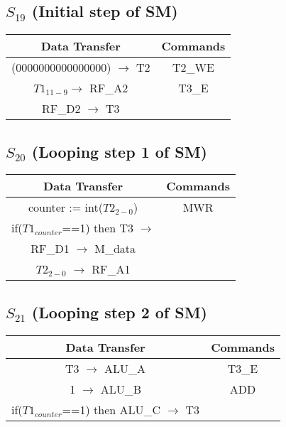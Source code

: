 \documentclass[]{article}
\begin{document}
            \subsection*{$S_{19}$ (Initial step of SM)} %
            \begin{center}
                \begin{tabular}{|c|c|}
                    \hline
                    Data Transfer & Commands \\
                    \hline
                    (0000000000000000) $\to$ T2 & T2\_WE\\
                    $T1_{11-9} \to$ RF\_A2 & T3\_E\\
                    RF\_D2 $\to$ T3 & \\
                    \hline
                \end{tabular}
            \end{center}            
            \subsection*{$S_{20}$ (Looping step 1 of SM)} %
            \begin{center}
                \begin{tabular}{|c|c|}
                    \hline
                    Data Transfer & Commands \\
                    \hline
                    counter := int($T2_{2-0}$) & MWR\\
                    if($T1_{counter}$==1) then T3 $\to$ & \\
                    RF\_D1 $\to$ M\_data & \\ %
                    $T2_{2-0}$ $\to$ RF\_A1 & \\
                    \hline
                \end{tabular}
            \end{center} 
            \subsection*{$S_{21}$ (Looping step 2 of SM)} %
            \begin{center}
                \begin{tabular}{|c|c|}
                    \hline
                    Data Transfer & Commands \\
                    \hline
                    T3 $\to$ ALU\_A & T3\_E\\
                    1 $\to$ ALU\_B & ADD\\
                    if($T1_{counter}$==1) then ALU\_C $\to$ T3 & \\
                    \hline
                \end{tabular}
            \end{center} 
\end{document}
